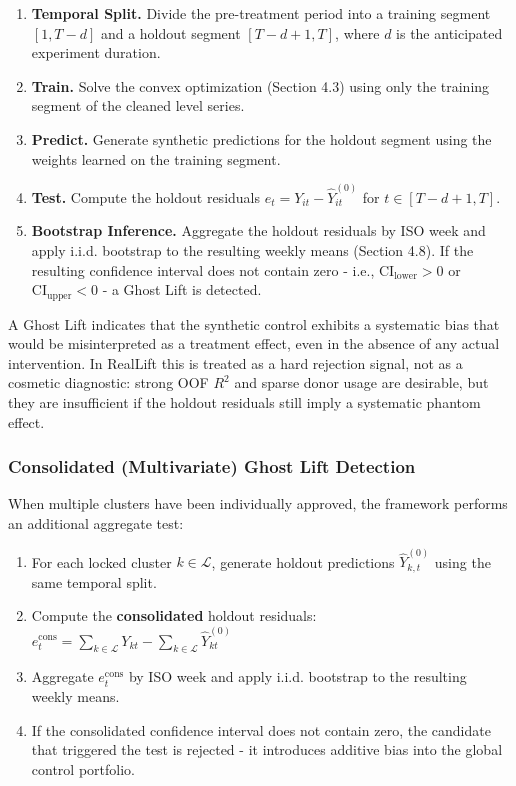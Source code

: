 \documentclass[11pt]{article}
\begin{document}
\begin{enumerate}
\item \textbf{Temporal Split.} Divide the pre-treatment period into a training segment $[1, T-d]$ and a holdout segment $[T-d+1, T]$, where $d$ is the anticipated experiment duration.
\item \textbf{Train.} Solve the convex optimization (Section 4.3) using only the training segment of the cleaned level series.
\item \textbf{Predict.} Generate synthetic predictions for the holdout segment using the weights learned on the training segment.
\item \textbf{Test.} Compute the holdout residuals $e_t = Y_{it} - \hat{Y}_{it}^{(0)}$ for $t \in [T-d+1, T]$.
\item \textbf{Bootstrap Inference.} Aggregate the holdout residuals by ISO week and apply i.i.d. bootstrap to the resulting weekly means (Section 4.8). If the resulting confidence interval does not contain zero - i.e., $\mathrm{CI}_{\mathrm{lower}} > 0$ or $\mathrm{CI}_{\mathrm{upper}} < 0$ - a Ghost Lift is detected.
\end{enumerate}

A Ghost Lift indicates that the synthetic control exhibits a systematic bias that would be misinterpreted as a treatment effect, even in the absence of any actual intervention. In RealLift this is treated as a hard rejection signal, not as a cosmetic diagnostic: strong OOF $R^2$ and sparse donor usage are desirable, but they are insufficient if the holdout residuals still imply a systematic phantom effect.

\subsubsection{Consolidated (Multivariate) Ghost Lift Detection}
When multiple clusters have been individually approved, the framework performs an additional aggregate test:

\begin{enumerate}
\item For each locked cluster $k \in \mathcal{L}$, generate holdout predictions $\hat{Y}_{k,t}^{(0)}$ using the same temporal split.
\item Compute the \textbf{consolidated} holdout residuals: $e_t^{\mathrm{cons}} = \sum_{k \in \mathcal{L}} Y_{kt} - \sum_{k \in \mathcal{L}} \hat{Y}_{kt}^{(0)}$
\item Aggregate $e_t^{\mathrm{cons}}$ by ISO week and apply i.i.d. bootstrap to the resulting weekly means.
\item If the consolidated confidence interval does not contain zero, the candidate that triggered the test is rejected - it introduces additive bias into the global control portfolio.
\end{enumerate}
\end{document}

